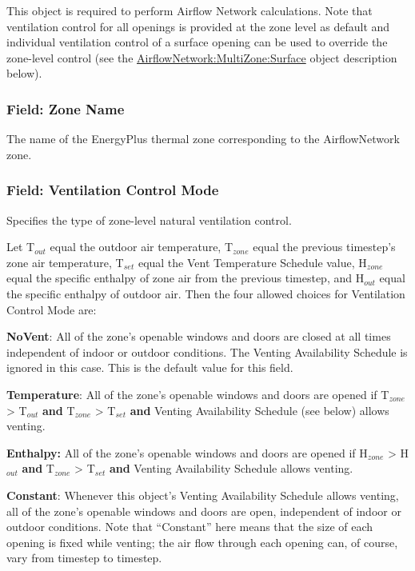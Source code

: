 This object is required to perform Airflow Network calculations. Note that ventilation control for all openings is provided at the zone level as default and individual ventilation control of a surface opening can be used to override the zone-level control (see the \hyperref[airflownetworkmultizonesurface]{AirflowNetwork:MultiZone:Surface} object description below).

\subsubsection{Field: Zone Name}\label{field-zone-name-001}

The name of the EnergyPlus thermal zone corresponding to the AirflowNetwork zone.

\subsubsection{Field: Ventilation Control Mode}\label{field-ventilation-control-mode}

Specifies the type of zone-level natural ventilation control.

Let T\(_{out}\) equal the outdoor air temperature, T\(_{zone}\) equal the previous timestep's zone air temperature, T\(_{set}\) equal the Vent Temperature Schedule value, H\(_{zone}\) equal the specific enthalpy of zone air from the previous timestep, and H\(_{out}\) equal the specific enthalpy of outdoor air. Then the four allowed choices for Ventilation Control Mode are:

\textbf{NoVent}: All of the zone's openable windows and doors are closed at all times independent of indoor or outdoor conditions. The Venting Availability Schedule is ignored in this case. This is the default value for this field.

\textbf{Temperature}: All of the zone's openable windows and doors are opened if T\(_{zone}\) \textgreater{} T\(_{out}\) \textbf{and} T\(_{zone}\) \textgreater{} T\(_{set}\) \textbf{and} Venting Availability Schedule (see below) allows venting.

\textbf{Enthalpy:} All of the zone's openable windows and doors are opened if H\(_{zone}\) \textgreater{} H\(_{out}\) \textbf{and} T\(_{zone}\) \textgreater{} T\(_{set}\) \textbf{and} Venting Availability Schedule allows venting.

\textbf{Constant}: Whenever this object's Venting Availability Schedule allows venting, all of the zone's openable windows and doors are open, independent of indoor or outdoor conditions. Note that ``Constant'' here means that the size of each opening is fixed while venting; the air flow through each opening can, of course, vary from timestep to timestep.

